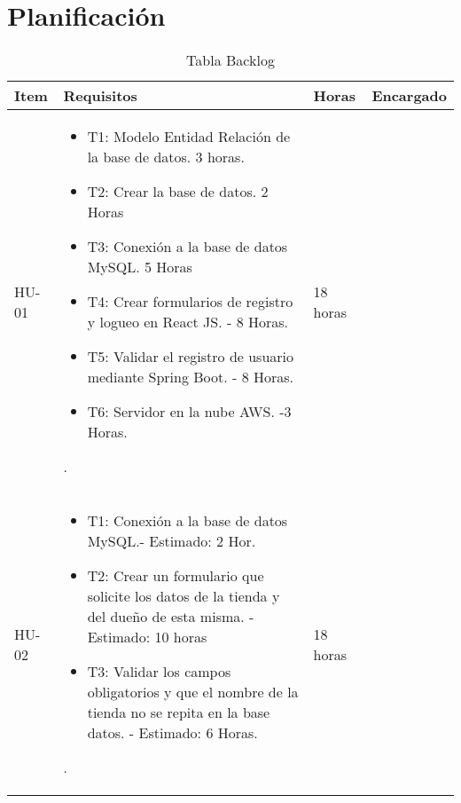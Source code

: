 \chapter{Planificación}


\begin{table}[htbp]
	\begin{center}
		\begin{tabular}{|p{2.5cm}|p{6.5cm}|p{2.5cm}|p{2.5cm}|}
			\hline
			Item & Requisitos & Horas & Encargado\\
			\hline \hline
			HU-01 & \begin{itemize}
				\item T1: Modelo Entidad Relación de la base de datos. 3 horas.
				
				\item T2: Crear la base de datos. 2 Horas
				
				\item T3: Conexión a la base de datos MySQL. 5 Horas
				
				\item T4: Crear formularios de registro y logueo en React JS. - 8 Horas.
				
				\item T5: Validar el registro de usuario mediante Spring Boot. - 8 Horas.
				
				\item T6: Servidor en la nube AWS. -3 Horas.
				
				
			\end{itemize}. & 18 horas & \\ \hline
			HU-02 &  \begin{itemize}
				\item T1: Conexión a la base de datos MySQL.- Estimado: 2 Hor.
				
				\item T2: Crear un formulario que solicite los datos de la tienda y
				del dueño de esta misma. - Estimado: 10 horas
				
				\item T3: Validar los campos obligatorios y que el nombre de la
				tienda no se repita en la base datos. - Estimado: 6 Horas.
				
				
			\end{itemize}. & 18 horas & \\ \hline
		
			
			
		\end{tabular}
		\caption{Tabla Backlog}
		\label{tabla:sencilla}
	\end{center}
\end{table}